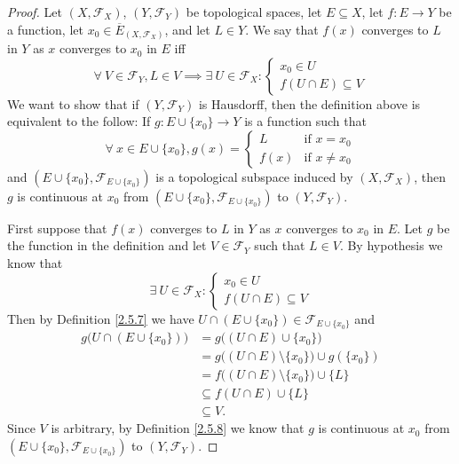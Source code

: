 \begin{proof}
    Let \((X, \mathcal{F}_X)\), \((Y, \mathcal{F}_Y)\) be topological spaces, let \(E \subseteq X\), let \(f : E \to Y\) be a function, let \(x_0 \in \overline{E}_{(X, \mathcal{F}_X)}\), and let \(L \in Y\).
    We say that \(f(x)\) converges to \(L\) in \(Y\) as \(x\) converges to \(x_0\) in \(E\) iff
    \[
        \forall\ V \in \mathcal{F}_Y, L \in V \implies \exists\ U \in \mathcal{F}_X : \begin{cases}
            x_0 \in U \\
            f(U \cap E) \subseteq V
        \end{cases}
    \]
    We want to show that if \((Y, \mathcal{F}_Y)\) is Hausdorff, then the definition above is equivalent to the follow:
    If \(g : E \cup \{x_0\} \to Y\) is a function such that
    \[
        \forall\ x \in E \cup \{x_0\}, g(x) = \begin{cases}
            L    & \text{if } x = x_0    \\
            f(x) & \text{if } x \neq x_0
        \end{cases}
    \]
    and \((E \cup \{x_0\}, \mathcal{F}_{E \cup \{x_0\}})\) is a topological subspace induced by \((X, \mathcal{F}_X)\), then \(g\) is continuous at \(x_0\) from \((E \cup \{x_0\}, \mathcal{F}_{E \cup \{x_0\}})\) to \((Y, \mathcal{F}_Y)\).

    First suppose that \(f(x)\) converges to \(L\) in \(Y\) as \(x\) converges to \(x_0\) in \(E\).
    Let \(g\) be the function in the definition and let \(V \in \mathcal{F}_Y\) such that \(L \in V\).
    By hypothesis we know that
    \[
        \exists\ U \in \mathcal{F}_X : \begin{cases}
            x_0 \in U \\
            f(U \cap E) \subseteq V
        \end{cases}
    \]
    Then by Definition \ref{2.5.7} we have \(U \cap (E \cup \{x_0\}) \in \mathcal{F}_{E \cup \{x_0\}}\) and
    \begin{align*}
        g\big(U \cap (E \cup \{x_0\})\big) & = g\big((U \cap E) \cup \{x_0\}\big)                      \\
                                           & = g\big((U \cap E) \setminus \{x_0\}\big) \cup g(\{x_0\}) \\
                                           & = f\big((U \cap E) \setminus \{x_0\}\big) \cup \{L\}      \\
                                           & \subseteq f(U \cap E) \cup \{L\}                          \\
                                           & \subseteq V.
    \end{align*}
    Since \(V\) is arbitrary, by Definition \ref{2.5.8} we know that \(g\) is continuous at \(x_0\) from \((E \cup \{x_0\}, \mathcal{F}_{E \cup \{x_0\}})\) to \((Y, \mathcal{F}_Y)\).


\end{proof}

